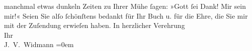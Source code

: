 \begin{ledgroupsized}[t]{13cm}
                    manchmal {\pb}etwas dunkeln Zeiten zu Ihrer Mühe
                    ſagen: »Gott ſei Dank! Mir sein mir!«\pend
           \pstart
           Seien Sie alſo ſchönſtens bedankt für Ihr Buch u. für die Ehre, die Sie mir mit der Zuſendung
                    erwieſen haben.\pend
           \pstart
           In herzlicher Verehrung{\\[\baselineskip]}Ihr{\\[\baselineskip]}\spacefill\mbox{J. V. Widmann}\pend
           \leftskip=0em{}
         
         \endnumbering{}\end{ledgroupsized}  \newcommand{\dateiname}{L01044}\newcommand{\titel}{Joseph Victor Widmann an Arthur Schnitzler, 28. 5. 1900}\newcommand{\editorInnen}{Martin Anton Müller und Gerd-Hermann Susen}
      